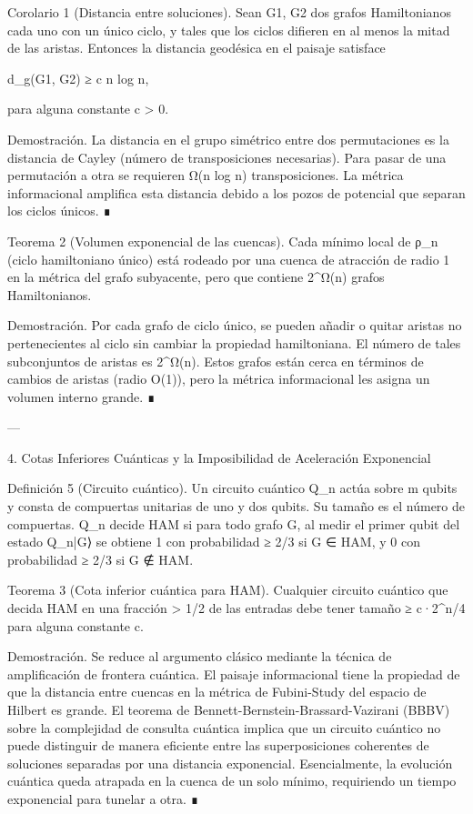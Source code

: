 \documentclass[12pt,twoside]{book}
\begin{document}
Corolario 1 (Distancia entre soluciones). Sean G1, G2 dos grafos Hamiltonianos cada uno con un único ciclo, y tales que los ciclos difieren en al menos la mitad de las aristas. Entonces la distancia geodésica en el paisaje satisface

d_g(G1, G2) ≥ c n log n,

para alguna constante c > 0.

Demostración. La distancia en el grupo simétrico entre dos permutaciones es la distancia de Cayley (número de transposiciones necesarias). Para pasar de una permutación a otra se requieren Ω(n log n) transposiciones. La métrica informacional amplifica esta distancia debido a los pozos de potencial que separan los ciclos únicos. ∎

Teorema 2 (Volumen exponencial de las cuencas). Cada mínimo local de ρ_n (ciclo hamiltoniano único) está rodeado por una cuenca de atracción de radio 1 en la métrica del grafo subyacente, pero que contiene 2^{Ω(n)} grafos Hamiltonianos.

Demostración. Por cada grafo de ciclo único, se pueden añadir o quitar aristas no pertenecientes al ciclo sin cambiar la propiedad hamiltoniana. El número de tales subconjuntos de aristas es 2^{Ω(n)}. Estos grafos están cerca en términos de cambios de aristas (radio O(1)), pero la métrica informacional les asigna un volumen interno grande. ∎

---

4. Cotas Inferiores Cuánticas y la Imposibilidad de Aceleración Exponencial

Definición 5 (Circuito cuántico). Un circuito cuántico Q_n actúa sobre m qubits y consta de compuertas unitarias de uno y dos qubits. Su tamaño es el número de compuertas. Q_n decide HAM si para todo grafo G, al medir el primer qubit del estado Q_n|G⟩ se obtiene 1 con probabilidad ≥ 2/3 si G ∈ HAM, y 0 con probabilidad ≥ 2/3 si G ∉ HAM.

Teorema 3 (Cota inferior cuántica para HAM). Cualquier circuito cuántico que decida HAM en una fracción > 1/2 de las entradas debe tener tamaño ≥ c·2^{n/4} para alguna constante c.

Demostración. Se reduce al argumento clásico mediante la técnica de amplificación de frontera cuántica. El paisaje informacional tiene la propiedad de que la distancia entre cuencas en la métrica de Fubini-Study del espacio de Hilbert es grande. El teorema de Bennett-Bernstein-Brassard-Vazirani (BBBV) sobre la complejidad de consulta cuántica implica que un circuito cuántico no puede distinguir de manera eficiente entre las superposiciones coherentes de soluciones separadas por una distancia exponencial. Esencialmente, la evolución cuántica queda atrapada en la cuenca de un solo mínimo, requiriendo un tiempo exponencial para tunelar a otra. ∎
\end{document}
